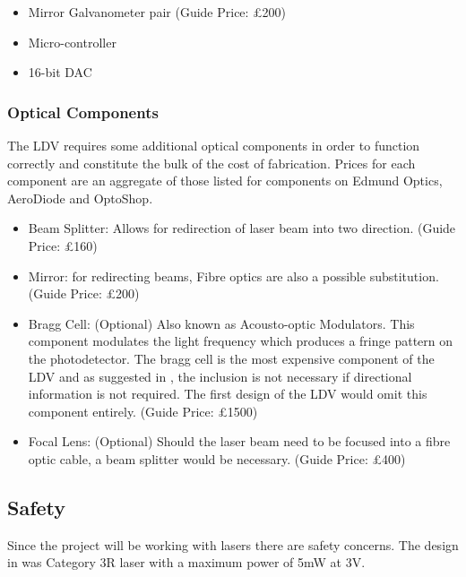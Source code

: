 \begin{itemize}
\begin{enumerate}
\begin{itemize}
        \item
            Mirror Galvanometer pair (Guide Price: £200)
        \item
            Micro-controller
        \item
            16-bit DAC
        \end{itemize}
    \end{enumerate}
  \end{itemize}

\hypertarget{optics}{%
\subsubsection{Optical Components}\label{optics}}

The LDV requires some additional optical components in order to function
correctly and constitute the bulk of the cost of fabrication. Prices for each
component are an aggregate of those listed for components on Edmund Optics,
AeroDiode and OptoShop.

\begin{itemize}

\item
  Beam Splitter: Allows for redirection of laser beam into two direction. (Guide
  Price: £160)
\item
  Mirror: for redirecting beams, Fibre optics are also a possible substitution.
  (Guide Price: £200)
\item
  Bragg Cell: (Optional) Also known as Acousto-optic Modulators. This component
  modulates the light frequency which produces a fringe pattern on the
  photodetector. The bragg cell is the most expensive component of the LDV and
  as suggested in \cite{malahs_design_2015}, the inclusion is not necessary if
  directional information is not required. The first design of the LDV would
  omit this component entirely. (Guide Price: £1500)
\item
  Focal Lens: (Optional) Should the laser beam need to be focused into a fibre
  optic cable, a beam splitter would be necessary. (Guide Price: £400)
\end{itemize}

\hypertarget{safety}{%
\subsection{Safety}\label{safety}}

Since the project will be working with lasers there are safety concerns. The
design in \cite{malahs_design_2015} was Category 3R laser with a maximum power
of 5mW at 3V.


